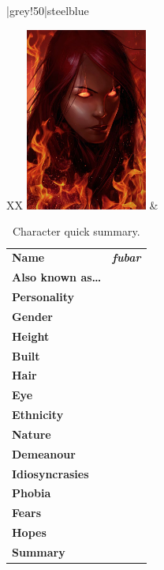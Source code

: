 \begin{table}
    \begin{framed}
        \centering
        \taburulecolor |grey!50|{steelblue} \arrayrulewidth=1pt
        \begin{tabu}{X[1]X[2]}
            \parbox[t]{1em}{\vspace{0pt}\includegraphics[width=4cm]{images/portrait.png}}
            &
            \begin{tabu}{XX[2]}
                \toprule
                \textbf{Name}                & \textbf{\Large \emph{fubar}}\\
                \textbf{Also known as\ldots} & \\
                \textbf{Personality}         & \\
                \midrule
                \textbf{Gender}              & \\
                \textbf{Height}              & \\
                \textbf{Built}               & \\
                \midrule
                \textbf{Hair}                & \\
                \textbf{Eye}                 & \\
                \textbf{Ethnicity}           & \\
                \midrule
                \textbf{Nature}              & \\
                \textbf{Demeanour}           & \\
                \textbf{Idiosyncrasies}      & \\
                \midrule
                \textbf{Phobia}              & \\
                \textbf{Fears}               & \\
                \textbf{Hopes}               & \\
                \midrule
                \textbf{Summary}             & \\
                \midrule
            \end{tabu} \\
        \end{tabu}
    \end{framed}
    \caption{Character quick summary.}
\label{tab:character-quick-summary}
\end{table}
